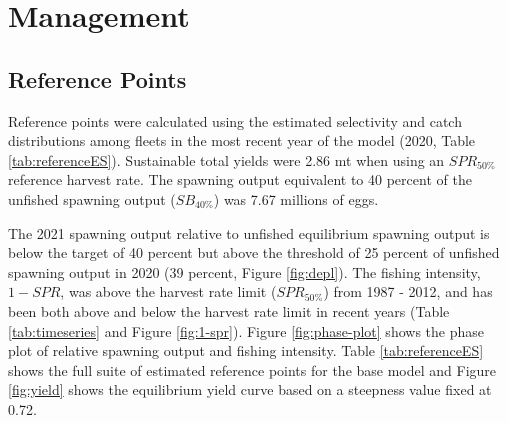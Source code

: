 \documentclass[11pt,
  english,
  letterpaper,
]{article}
\begin{document}
\leavevmode\tagmcend\tagstructend\par


\hypertarget{management}{%
\section{Management}\label{management}}

\leavevmode\tagmcend\tagstructend


\hypertarget{reference-points}{%
\subsection{Reference Points}\label{reference-points}}

\leavevmode\tagmcend\tagstructend


Reference points were calculated using the estimated selectivity and catch distributions among fleets in the most recent year of the model (2020, Table \ref{tab:referenceES}). Sustainable total yields were 2.86 mt when using an {\(SPR_{50\%}\)\leavevmode\tagmcend\tagstructend} reference harvest rate. The spawning output equivalent to 40 percent of the unfished spawning output ({\(SB_{40\%}\)\leavevmode\tagmcend\tagstructend}) was 7.67 millions of eggs.

\leavevmode\tagmcend\tagstructend\par


The 2021 spawning output relative to unfished equilibrium spawning output is below the target of 40 percent but above the threshold of 25 percent of unfished spawning output in 2020 (39 percent, Figure \ref{fig:depl}). The fishing intensity, {\(1-SPR\)\leavevmode\tagmcend\tagstructend}, was above the harvest rate limit ({\(SPR_{50\%}\)\leavevmode\tagmcend\tagstructend}) from 1987 - 2012, and has been both above and below the harvest rate limit in recent years (Table \ref{tab:timeseries} and Figure \ref{fig:1-spr}). Figure \ref{fig:phase-plot} shows the phase plot of relative spawning output and fishing intensity. Table \ref{tab:referenceES} shows the full suite of estimated reference points for the base model and Figure \ref{fig:yield} shows the equilibrium yield curve based on a steepness value fixed at 0.72.
\end{document}
